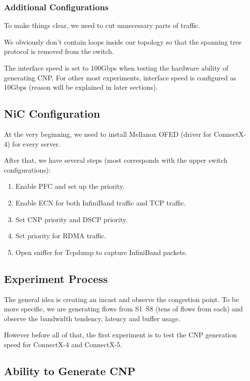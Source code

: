 \documentclass[12pt,a4paper]{article}
\begin{document}
\subsubsection{Additional Configurations}
To make things clear, we need to cut unnecessary parts of traffic.

We obviously don't contain loops inside our topology so that the spanning tree protocol is removed from the switch.

The interface speed is set to 100Gbps when testing the hardware ability of generating CNP.
For other most experiments, interface speed is configured as 10Gbps (reason will be explained in later sections).

\subsection{NiC Configuration}
At the very beginning, we need to install Mellanox OFED (driver for ConnectX-4) for every server.

After that, we have several steps (most corresponds with the upper switch configurations):
\begin{enumerate}
	\item Enable PFC and set up the priority.
	\item Enable ECN for both InfiniBand traffic and TCP traffic.
	\item Set CNP priority and DSCP priority.
	\item Set priority for RDMA traffic.
	\item Open sniffer for Tcpdump to capture InfiniBand packets.
\end{enumerate}

\subsection{Experiment Process}

The general idea is creating an incast and observe the congestion point.
To be more specific, we are generating flows from S1~S8 (tens of flows from each) and observe the bandwidth tendency, latency and buffer usage.

However before all of that, the first experiment is to test the CNP generation speed for ConnectX-4 and ConnectX-5. 

\subsection{Ability to Generate CNP}
\end{document}
